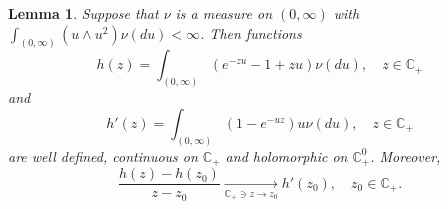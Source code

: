 \documentclass[12pt]{amsart}
\theoremstyle{plain}
\newtheorem{lem}[thm]{Lemma}
\theoremstyle{definition}
\numberwithin{equation}{section}
\begin{document}
\begin{lem}
\label{lem: extension lemma for branching mechanism}
    Suppose that  $\nu$ is a measure on $(0,\infty)$ with $\int_{(0,\infty)} (u \wedge u^2) \nu(du)< \infty$. 
    Then functions
\begin{equation}
    h (z) = \int_{(0,\infty)} (e^{-zu} - 1 + zu) \nu(du), \quad z \in \mathbb C_+
\end{equation}
and
\begin{equation}
\label{eq: deriavetive of the Poission partb}
    h'(z) = \int_{(0,\infty)}(1- e^{-uz})u \nu(du), \quad z \in \mathbb C_+
\end{equation}
    are well defined, continuous on $\mathbb C_+$ and holomorphic on $\mathbb C_+^0$.
    Moreover, 
\[
    \frac{h(z)-h(z_0)}{z-z_0} \xrightarrow[\mathbb C_+\ni z \to z_0]{} h'(z_0),\quad z_0 \in \mathbb C_+.
\] %
\end{lem}
\end{document}
